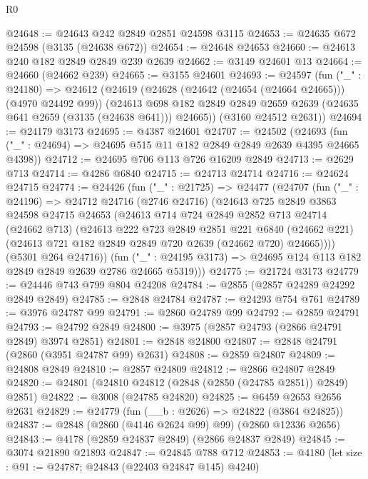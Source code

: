 \begin{lexlean}{R0}
\begin{coremodule}
@24648 := @24643 @242 @2849 @2851 @24598 @3115
@24653 := @24635 @672 @24598 (@3135 (@24638 @672))
@24654 := @24648 @24653
@24660 := @24613 @240 @182 @2849 @2849 @239 @2639
@24662 := @3149 @24601 @13
@24664 := @24660 (@24662 @239)
@24665 := @3155 @24601
@24693 := @24597
    (fun ("_" : @24180) =>
    @24612
      (@24619
        (@24628 (@24642 (@24654 (@24664 @24665))) (@4970 @24492 @99))
        (@24613 @698 @182 @2849 @2849 @2659 @2639 (@24635 @641 @2659 (@3135 (@24638 @641))) @24665))
      (@3160 @24512 @2631))
@24694 := @24179 @3173
@24695 := @4387 @24601
@24707 := @24502
    (@24693 (fun ("_" : @24694) => @24695 @515 @11 @182 @2849 @2849 @2639 @4395 @24665 @4398))
@24712 := @24695 @706 @113 @726 @16209 @2849
@24713 := @2629 @713
@24714 := @4286 @6840
@24715 := @24713 @24714
@24716 := @24624 @24715
@24774 := @24426
    (fun ("_" : @21725) =>
    @24477
      (@24707
        (fun ("_" : @24196) =>
        @24712
          @24716
          (@2746 @24716)
          (@24643
            @725
            @2849
            @3863
            @24598
            @24715
            @24653
            (@24613
              @714
              @724
              @2849
              @2852
              @713
              @24714
              (@24662 @713)
              (@24613
                @222
                @723
                @2849
                @2851
                @221
                @6840
                (@24662 @221)
                (@24613 @721 @182 @2849 @2849 @720 @2639 (@24662 @720) @24665))))
          (@5301 @264 @24716))
        (fun ("_" : @24195 @3173) => @24695 @124 @113 @182 @2849 @2849 @2639 @2786 @24665 @5319)))
@24775 := @21724 @3173
@24779 := @24446 @743 @799 @804 @24208
@24784 := @2855 (@2857 @24289 @24292 @2849 @2849)
@24785 := @2848 @24784
@24787 := @24293 @754 @761
@24789 := @3976 @24787 @99
@24791 := @2860 @24789 @99
@24792 := @2859 @24791
@24793 := @24792 @2849
@24800 := @3975 (@2857 @24793 (@2866 @24791 @2849) @3974 @2851)
@24801 := @2848 @24800
@24807 := @2848 @24791 (@2860 (@3951 @24787 @99) @2631)
@24808 := @2859 @24807
@24809 := @24808 @2849
@24810 := @2857 @24809
@24812 := @2866 @24807 @2849
@24820 := @24801 (@24810 @24812 (@2848 (@2850 (@24785 @2851)) @2849) @2851)
@24822 := @3008 (@24785 @24820)
@24825 := @6459 @2653 @2656 @2631
@24829 := @24779 (fun (__b : @2626) => @24822 (@3864 @24825))
@24837 := @2848 (@2860 (@4146 @2624 @99) @99) (@2860 @12336 @2656)
@24843 := @4178 (@2859 @24837 @2849) (@2866 @24837 @2849)
@24845 := @3074 @21890 @21893
@24847 := @24845 @788 @712
@24853 := @4180 (let size : @91 := @24787; @24843 (@22403 @24847 @145) @4240)

\end{coremodule}
\end{lexlean}
